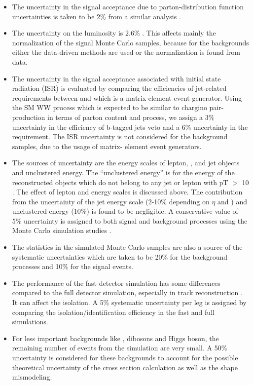 \begin{itemize}
\item The uncertainty in the signal acceptance due to parton-distribution function uncertainties 
  is taken to be 2\% from a similar analysis \cite{Khachatryan:2014qwa}.

\item The uncertainty on the luminosity  is $2.6\%$ \cite{CMS-PAS-LUM-13-001}.  This affects mainly the
  normalization of the signal Monte Carlo samples, because for the backgrounds  either  the data-driven methods are used or 
the normalization is found from data.

\item The uncertainty in the signal acceptance associated with initial state radiation (ISR)
is evaluated by comparing the efficiencies of jet-related requirements between \PYTHIA
 and \MADGRAPH which is a matrix-element event generator. Using the SM WW process which
 is expected to be similar to chargino pair-production in terms of parton content and process, we assign a 3\% uncertainty in 
the efficiency of  b-tagged jets veto and a 6\% uncertainty in the \deltaphi requirement. The ISR
 uncertainty is not considered for the background samples, due to the usage of matrix-
 element event generators.

\item The sources of \MPT uncertainty are the energy scales of lepton, \Tau, and jet
objects and unclustered energy.  The ``unclustered energy'' is for the energy of the reconstructed objects which
 do not belong to any jet or lepton with pT $>$ 10 \GeV. The effect of lepton and \Tau
 energy scales is discussed above. The contribution from the uncertainty of the jet energy scale (2-10\% depending on $\eta$  and \PT) and
 unclustered energy (10\%) is found to be negligible. A conservative value of 5\% uncertainty
 is assigned to both signal and background processes using the Monte
 Carlo simulation studies \cite{Khachatryan:2015kxa, Khachatryan:2014qwa}.

\item The statistics in the simulated Monte Carlo samples are also a
 source of the systematic uncertainties which are taken to be 20\% for the background processes and 10\% for the signal events.

\item The performance of the fast detector simulation has some differences compared to the full detector simulation, especially in
 track reconstruction \cite{Khachatryan:2015kxa}. It can affect the \Tau isolation. A 5\% systematic uncertainty per
 \Tau leg is assigned by comparing the \Tau isolation/identification efficiency in the fast
 and full simulations. 


\item For less important backgrounds like \ttbar,  dibosons and Higgs boson, the remaining number of
events from the simulation are very small. A 50\% uncertainty is considered for these backgrounds to account for the possible theoretical uncertainty of the
cross section calculation as well as the shape mismodeling.
\end{itemize}


